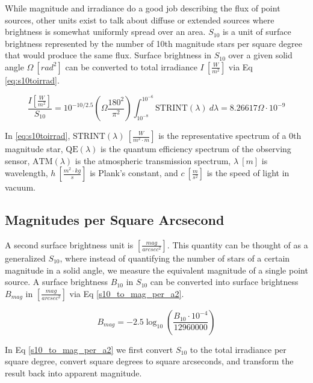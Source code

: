 While magnitude and irradiance do a good job describing the flux of point sources, other units exist
to talk about diffuse or extended sources where brightness is somewhat uniformly spread over an
area. $S_{10}$ is a unit of surface brightness represented by the number of 10th magnitude stars per square degree that would produce the same flux.
Surface brightness in $S_{10}$ over a given solid angle $\Omega \: \left[ rad^2 \right]$ can be converted to total irradiance $I \: \left[ \frac{W}{m^2} \right]$ via Eq \ref{eq:s10toirrad}.

\begin{equation} \label{eq:s10toirrad}
 \frac{I \left[ \frac{W}{m^2} \right]}{S_{10}} = 10^{-10/2.5} \left( \Omega \frac{180^2}{\pi^2} \right)
  \int_{10^{-8}}^{10^{-6}}{ \textrm{STRINT}(\lambda) \: d\lambda} = 8.26617 \Omega \cdot 10^{-9}
\end{equation}

In \ref{eq:s10toirrad}, $\textrm{STRINT}(\lambda) \: \left[ \frac{W}{m^2 \cdot m} \right]$ is the
representative spectrum of a 0th magnitude star, $\textrm{QE}(\lambda)$ is the quantum efficiency
spectrum of the observing sensor, $\textrm{ATM}(\lambda)$ is the atmospheric transmission spectrum, $\lambda \: [m]$ is wavelength, $h \: \left[
\frac{m^2 \cdot kg}{s} \right]$ is Plank's constant, and $c \: \left[ \frac{m}{s^2} \right]$ is the
speed of light in vacuum. 

\subsection{Magnitudes per Square Arcsecond}

A second surface brightness unit is $\left[ \frac{mag}{arcsec^2} \right]$. This quantity can be
thought of as a generalized $S_{10}$, where instead of quantifying the number of stars of a certain
magnitude in a solid angle, we measure the equivalent magnitude of a single point source. A surface
brightness $B_{10}$ in $S_{10}$ can be converted into surface brightness $B_{mag}$ in 
$\left[ \frac{mag}{arcsec^2} \right]$ via Eq \ref{s10_to_mag_per_a2}.

\begin{equation} \label{s10_to_mag_per_a2}
	B_{mag} = -2.5 \log_{10}\left( \frac{B_{10} \cdot 10^{-4}}{12960000} \right)
\end{equation}

In Eq \ref{s10_to_mag_per_a2} we first convert $S_{10}$ to the total irradiance per square degree,
convert square degrees to square arcseconds, and transform the result back into apparent magnitude.

